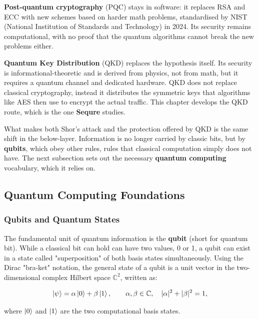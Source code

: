 \documentclass[12pt, a4paper]{article}
\begin{document}
\textbf{Post-quantum cryptography} (PQC) stays in software: it replaces RSA and ECC with new schemes based on harder math problems, standardised by NIST (National Institution of Standards and Technology) in 2024. Its security remains computational, with no proof that the quantum algorithms cannot break the new problems either.

\textbf{Quantum Key Distribution} (QKD) replaces the hypothesis itself. Its security is informational-theoretic and is derived from physics, not from math, but it requires a quantum channel and dedicated hardware. QKD does not replace classical cryptography, instead it distributes the symmetric keys that algorithms like AES then use to encrypt the actual traffic. This chapter develops the QKD route, which is the one \textbf{Sequre} studies. 

What makes both Shor's attack and the protection offered by QKD is the same shift in the below-layer. Information is no longer carried by classic bits, but by \textbf{qubits}, which obey other rules, rules that classical computation simply does not have. The next subsection sets out the necessary \textbf{quantum computing} vocabulary, which it relies on.

\subsection{Quantum Computing Foundations}
\label{sec:qc-foundations}

\subsubsection{Qubits and Quantum States}

The fundamental unit of quantum information is the \textbf{qubit} (short for quantum bit). While a classical bit can hold can have two values, 0 or 1, a qubit can exist in a state called "superposition" of both basis states simultaneously. Using the Dirac "bra-ket" notation, the general state of a qubit is a unit vector in the two-dimensional complex Hilbert space $\mathbb{C}^2$, written as: 

\begin{equation*}
  \ket{\psi} = \alpha\ket{0} + \beta\ket{1},
  \qquad \alpha,\beta \in \mathbb{C}, \quad |\alpha|^2 + |\beta|^2 = 1,
  \label{eq:qubit}
\end{equation*}

where $\ket{0}$ and $\ket{1}$ are the two computational basis states.
\end{document}
